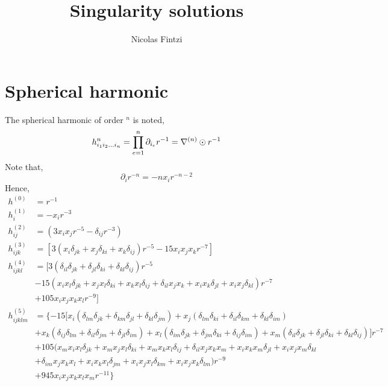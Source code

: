 \documentclass[12pt]{My_preprint}
\title{
    Singularity solutions
    }
\author[1,2]{Nicolas Fintzi}
\newcommand{\ii}{\delta}
\begin{document}
\maketitle

\begin{abstract}
\end{abstract}

\section{Spherical harmonic}
The spherical harmonic of order $^n$ is noted,
\begin{equation}
    h^{n}_{i_1i_2\ldots i_n}
    =
    \prod_{e=1}^{n}
    \partial_{i_e}
    r^{-1}
    = \mathbf{\nabla}^{(n)}
    \odot 
    r^{-1}
\end{equation}
Note that, 
\begin{equation}
    \partial_i r^{-n}
    =
    - n
    x_i r^{-n-2}
\end{equation}
Hence, 
\begin{align*}
    h^{(0)} &= r^{-1}\\
    h^{(1)}_i &= - x_i r^{-3}\\
    h^{(2)}_{ij} &= (3 x_i x_j r^{-5} - \ii_{ij} r^{-3})\\
    h^{(3)}_{ijk} &= [3 (x_i \ii_{jk} + x_j \ii_{ki} + x_k \ii_{ij})r^{-5} - 15 x_ix_jx_k r^{-7}]\\
    h^{(4)}_{ijkl} &= [
    3 (\ii_{il} \ii_{jk} + \ii_{jl} \ii_{ki} + \ii_{kl} \ii_{ij})r^{-5} \\
    &- 15 (x_ix_l  \ii_{jk} + x_jx_l  \ii_{ki} + x_k x_l \ii_{ij} + \ii_{il}x_jx_k+ x_i x_k\ii_{jl}+x_ix_j\ii_{kl}) r^{-7}\\
    &+ 105  x_ix_jx_kx_l r^{-9}
    ]\\
    h^{(5)}_{ijklm} &= \{
    - 15 [
        x_i ( \ii_{lm} \ii_{jk}+\ii_{km}\ii_{jl}+\ii_{kl}\ii_{jm}) 
        + x_j ( \ii_{lm}\ii_{ki}+\ii_{il}\ii_{km}+\ii_{kl}\ii_{im})\\
        &+ x_k (\ii_{ij}\ii_{lm}+\ii_{il}\ii_{jm} +\ii_{jl}\ii_{im})
        + x_l (\ii_{im} \ii_{jk}+ \ii_{jm}\ii_{ki}+\ii_{ij}\ii_{im})
        + x_m (\ii_{il} \ii_{jk} + \ii_{jl} \ii_{ki} + \ii_{kl} \ii_{ij})
     ] r^{-7} \\
    &+ 105  (x_mx_ix_l  \ii_{jk} + x_m x_jx_l  \ii_{ki} + x_m x_k x_l\ii_{ij} + \ii_{il}x_jx_kx_m + x_i x_kx_m\ii_{jl}+x_ix_jx_m \ii_{kl}\\
    &+ \ii_{im}x_jx_kx_l+x_ix_kx_l\ii_{jm}+x_ix_jx_l\ii_{km}+x_ix_jx_k\ii_{lm}) r^{-9}\\
    &+ 945  x_ix_jx_kx_lx_m r^{-11}
    \} \\
\end{align*}
\end{document}
